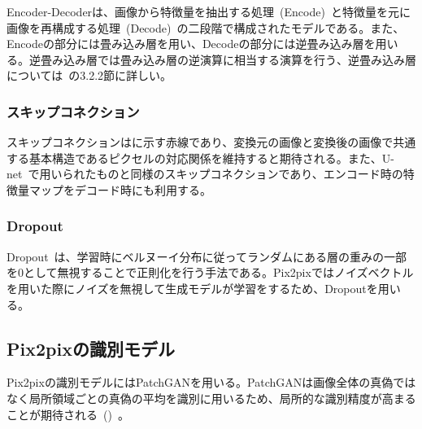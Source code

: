 Encoder-Decoderは、画像から特徴量を抽出する処理~(Encode)~と特徴量を元に画像を再構成する処理~(Decode)~の二段階で構成されたモデルである。また、Encodeの部分には畳み込み層を用い、Decodeの部分には逆畳み込み層を用いる。逆畳み込み層では畳み込み層の逆演算に相当する演算を行う、逆畳み込み層については~\cite{Deconv}の3.2.2節に詳しい。

\subsubsection{スキップコネクション}

スキップコネクションはに示す赤線であり、変換元の画像と変換後の画像で共通する基本構造であるピクセルの対応関係を維持すると期待される。また、U-net~\cite{u-net}で用いられたものと同様のスキップコネクションであり、エンコード時の特徴量マップをデコード時にも利用する。

\subsubsection{Dropout}

Dropout~\cite{Dropout}は、学習時にベルヌーイ分布に従ってランダムにある層の重みの一部を0として無視することで正則化を行う手法である。Pix2pixではノイズベクトルを用いた際にノイズを無視して生成モデルが学習をするため、Dropoutを用いる。

\subsection{Pix2pixの識別モデル}

Pix2pixの識別モデルにはPatchGANを用いる。PatchGANは画像全体の真偽ではなく局所領域ごとの真偽の平均を識別に用いるため、局所的な識別精度が高まることが期待される~()~。

